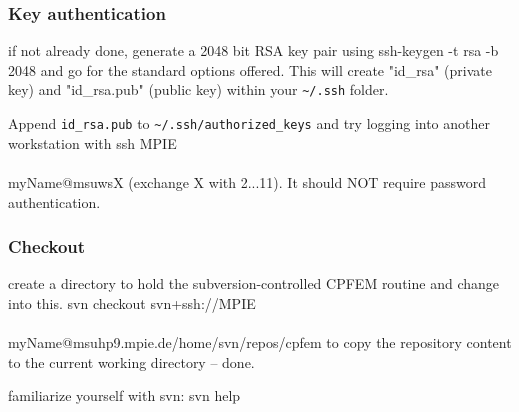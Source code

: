 \subsubsection{Key authentication}
if not already done, generate a 2048 bit RSA key pair using 
ssh-keygen -t rsa -b 2048 
and go for the standard options offered. This will create "id\_rsa" (private key) and "id\_rsa.pub" (public key) within your \verb|~/.ssh| folder.

Append \verb|id_rsa.pub| to \verb|~/.ssh/authorized_keys| and try logging into another workstation with 
ssh MPIE\\\\myName@msuwsX
(exchange X with 2...11). It should NOT require password authentication.

\subsubsection{Checkout}
create a directory to hold the subversion-controlled CPFEM routine and change into this. 
svn checkout svn+ssh://MPIE\\\\myName@msuhp9.mpie.de/home/svn/repos/cpfem
to copy the repository content to the current working directory -- done.

familiarize yourself with svn: svn help